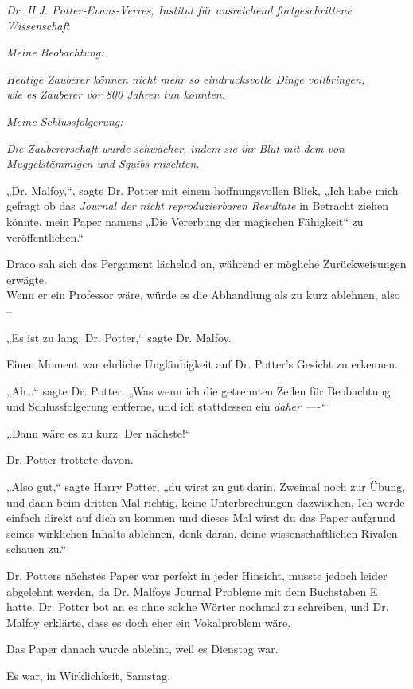 {\emph{Dr. H.J. Potter-Evans-Verres, Institut für ausreichend fortgeschrittene Wissenschaft}

\emph{Meine Beobachtung:}

\emph{Heutige Zauberer können nicht mehr so eindrucksvolle Dinge vollbringen,}\\ \emph{wie es Zauberer vor 800 Jahren tun konnten.}

\emph{Meine Schlussfolgerung:}

\emph{Die Zaubererschaft wurde schwächer, indem sie ihr Blut mit dem von Muggelstämmigen und Squibs mischten.}

„Dr. Malfoy,“, sagte Dr. Potter mit einem hoffnungsvollen Blick, „Ich habe mich gefragt ob das \emph{Journal der nicht reproduzierbaren Resultate} in Betracht ziehen könnte, mein Paper namens „Die Vererbung der magischen Fähigkeit“ zu veröffentlichen.“

Draco sah sich das Pergament lächelnd an, während er mögliche Zurückweisungen erwägte.\\ Wenn er ein Professor wäre, würde es die Abhandlung als zu kurz ablehnen, also --

„Es ist zu lang, Dr. Potter,“ sagte Dr. Malfoy.

Einen Moment war ehrliche Ungläubigkeit auf Dr. Potter's Gesicht zu erkennen.

„Ah…“ sagte Dr. Potter. „Was wenn ich die getrennten Zeilen für Beobachtung und Schlussfolgerung entferne, und ich stattdessen ein \emph{daher ----“}

\emph{„}Dann wäre es zu kurz. Der nächste!“

Dr. Potter trottete davon.

„Also gut,“ sagte Harry Potter, „du wirst zu gut darin. Zweimal noch zur Übung, und dann beim dritten Mal richtig, keine Unterbrechungen dazwischen, Ich werde einfach direkt auf dich zu kommen und dieses Mal wirst du das Paper aufgrund seines wirklichen Inhalts ablehnen, denk daran, deine wissenschaftlichen Rivalen schauen zu.“

Dr. Potters nächstes Paper war perfekt in jeder Hinsicht, musste jedoch leider abgelehnt werden, da Dr. Malfoys Journal Probleme mit dem Buchstaben E hatte. Dr. Potter bot an es ohne solche Wörter nochmal zu schreiben, und Dr. Malfoy erklärte, dass es doch eher ein Vokalproblem wäre.

Das Paper danach wurde ablehnt, weil es Dienstag war.

Es war, in Wirklichkeit, Samstag.

}
